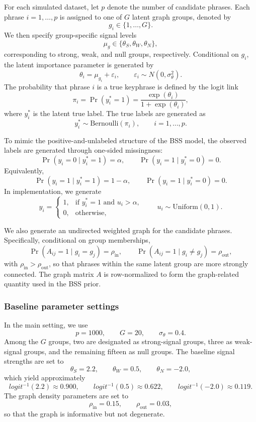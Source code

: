 \documentclass[11pt]{article}
\begin{document}
For each simulated dataset, let $p$ denote the number of candidate phrases. Each phrase $i=1,\ldots,p$ is assigned to one of $G$ latent graph groups, denoted by
\[
g_i \in \{1,\ldots,G\}.
\]
We then specify group-specific signal levels
\[
\mu_g \in \{\theta_S,\theta_W,\theta_N\},
\]
corresponding to strong, weak, and null groups, respectively. Conditional on $g_i$, the latent importance parameter is generated by
\[
\theta_i = \mu_{g_i} + \varepsilon_i, \qquad \varepsilon_i \sim N(0,\sigma_\theta^2).
\]
The probability that phrase $i$ is a true keyphrase is defined by the logit link
\[
\pi_i = \Pr(y_i^*=1)=\frac{\exp(\theta_i)}{1+\exp(\theta_i)},
\]
where $y_i^*$ is the latent true label. The true labels are generated as
\[
y_i^* \sim \mathrm{Bernoulli}(\pi_i), \qquad i=1,\ldots,p.
\]

To mimic the positive-and-unlabeled structure of the BSS model, the observed labels are generated through one-sided missingness:
\[
\Pr(y_i=0\mid y_i^*=1)=\alpha, \qquad \Pr(y_i=1\mid y_i^*=0)=0.
\]
Equivalently,
\[
\Pr(y_i=1\mid y_i^*=1)=1-\alpha, \qquad \Pr(y_i=1\mid y_i^*=0)=0.
\]
In implementation, we generate
\[
y_i =
\begin{cases}
1, & \text{if } y_i^*=1 \text{ and } u_i>\alpha,\\
0, & \text{otherwise},
\end{cases}
\qquad u_i \sim \mathrm{Uniform}(0,1).
\]

We also generate an undirected weighted graph for the candidate phrases. Specifically, conditional on group memberships,
\[
\Pr(A_{ij}=1 \mid g_i=g_j)=\rho_{\mathrm{in}},
\qquad
\Pr(A_{ij}=1 \mid g_i\neq g_j)=\rho_{\mathrm{out}},
\]
with $\rho_{\mathrm{in}}>\rho_{\mathrm{out}}$, so that phrases within the same latent group are more strongly connected. The graph matrix $A$ is row-normalized to form the graph-related quantity used in the BSS prior.

\subsubsection{Baseline parameter settings}

In the main setting, we use
\[
p=1000, \qquad G=20, \qquad \sigma_\theta=0.4.
\]
Among the $G$ groups, two are designated as strong-signal groups, three as weak-signal groups, and the remaining fifteen as null groups. The baseline signal strengths are set to
\[
\theta_S=2.2,\qquad \theta_W=0.5,\qquad \theta_N=-2.0,
\]
which yield approximately
\[
logit^{-1}(2.2)\approx 0.900,\qquad
logit^{-1}(0.5)\approx 0.622,\qquad
logit^{-1}(-2.0)\approx 0.119.
\]
The graph density parameters are set to
\[
\rho_{\mathrm{in}}=0.15,\qquad \rho_{\mathrm{out}}=0.03,
\]
so that the graph is informative but not degenerate.
\end{document}
